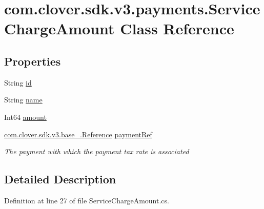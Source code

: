 \hypertarget{classcom_1_1clover_1_1sdk_1_1v3_1_1payments_1_1_service_charge_amount}{}\section{com.\+clover.\+sdk.\+v3.\+payments.\+Service\+Charge\+Amount Class Reference}
\label{classcom_1_1clover_1_1sdk_1_1v3_1_1payments_1_1_service_charge_amount}
\subsection*{Properties}
\begin{DoxyCompactItemize}
\item 
String \hyperlink{classcom_1_1clover_1_1sdk_1_1v3_1_1payments_1_1_service_charge_amount_aec20c03cbeee3175ae6a00b0ce5d2701}{id}
\item 
String \hyperlink{classcom_1_1clover_1_1sdk_1_1v3_1_1payments_1_1_service_charge_amount_a92dcb5c471464f498996215f5ed4e9dd}{name}
\item 
Int64 \hyperlink{classcom_1_1clover_1_1sdk_1_1v3_1_1payments_1_1_service_charge_amount_ae3bea9ffeb629a43756f9e5130b5e9b6}{amount}
\item 
\hyperlink{classcom_1_1clover_1_1sdk_1_1v3_1_1base___1_1_reference}{com.\+clover.\+sdk.\+v3.\+base\+\_\+.\+Reference} \hyperlink{classcom_1_1clover_1_1sdk_1_1v3_1_1payments_1_1_service_charge_amount_a374695852cc1abe23dab037151f76b47}{payment\+Ref}
\begin{DoxyCompactList}\small\item\em The payment with which the payment tax rate is associated \end{DoxyCompactList}\end{DoxyCompactItemize}


\subsection{Detailed Description}


Definition at line 27 of file Service\+Charge\+Amount.\+cs.



